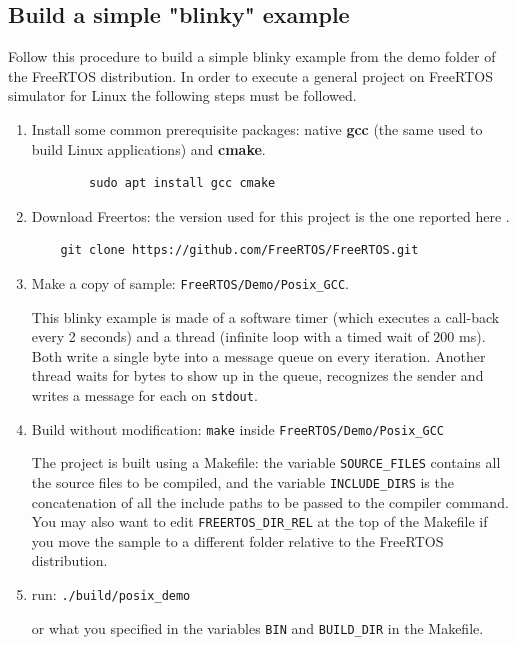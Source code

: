 \subsection{Build a simple "blinky" example}\label{sub:linux_blink}
Follow this procedure to build a simple blinky example from the demo folder of the FreeRTOS distribution.
In order to execute a general project on FreeRTOS simulator for Linux the following steps must be followed. 
\begin{enumerate}
    \item Install some common prerequisite packages: native \textbf{gcc} (the same used to build Linux applications) and \textbf{cmake}.
    \begin{lstlisting}
        sudo apt install gcc cmake
    \end{lstlisting}
    \item Download Freertos: the version used for this project is the one reported here \cite{freertosdownload}.
    \begin{lstlisting}
    git clone https://github.com/FreeRTOS/FreeRTOS.git
    \end{lstlisting}
    \item Make a copy of sample: \texttt{FreeRTOS/Demo/Posix\_GCC}.
    
    This blinky example is made of a software timer (which executes a call-back every 2 seconds) and a thread (infinite loop with a timed wait of 200 ms). Both write a single byte into a message queue on every iteration. Another thread waits for bytes to show up in the queue, recognizes the sender and writes a message for each on \texttt{stdout}.
    \item Build without modification: \texttt{make} inside \texttt{FreeRTOS/Demo/Posix\_GCC}
    
    The project is built using a Makefile: the variable \texttt{SOURCE\_FILES} contains all the source files to be compiled, and the variable \texttt{INCLUDE\_DIRS} is the concatenation of all the include paths to be passed to the compiler command. You may also want to edit \texttt{FREERTOS\_DIR\_REL} at the top of the Makefile if you move the sample to a different folder relative to the FreeRTOS distribution.
    \item run: \texttt{./build/posix\_demo} 
    
    or what you specified in the variables \texttt{BIN} and \texttt{BUILD\_DIR} in the Makefile.
\end{enumerate}

